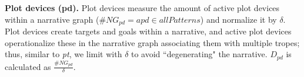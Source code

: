 \textbf{Plot devices (pd).} Plot devices measure the amount of active plot devices within a narrative graph ($\#NG_{pd} = apd \in allPatterns$) and normalize it by $\delta$. Plot devices create targets and goals within a narrative, and active plot devices operationalize these in the narrative graph associating them with multiple tropes; thus, similar to \emph{pt}, we limit with $\delta$ to avoid ``degenerating" the narrative. $D_{pd}$ is calculated as $\frac{\#NG_{pd}}{\delta}$.











